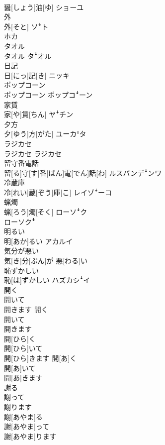 \documentclass[8pt]{extreport}
\begin{document}
\begin{CJK}{UTF8}{min}
\\	醤[しょう]油[ゆ]	ショーユ
\\	外	
\\	外[そと]	ソꜜト 
\\	ホカ
\\	タオル	
\\	タオル	タꜜオル
\\	日記	
\\	日[にっ]記[き]	ニッキ
\\	ポップコーン	
\\	ポップコーン	ポップコꜜーン
\\	家賃	
\\	家[や]賃[ちん]	ヤꜜチン
\\	夕方	
\\	夕[ゆう]方[がた]	ユーカ°タ
\\	ラジカセ	
\\	ラジカセ	ラジカセ
\\	留守番電話	
\\	留[る]守[す]番[ばん]電[でん]話[わ]	ルスバンデꜜンワ
\\	冷蔵庫	
\\	冷[れい]蔵[ぞう]庫[こ]	レイゾꜜーコ
\\	蝋燭	
\\	蝋[ろう]燭[そく]	ローソꜜク 
\\	ローソクꜜ
\\	明るい	
\\	明[あか]るい	アカルイ
\\	気分が悪い	
\\	気[き]分[ぶん]が 悪[わる]い	
\\	恥ずかしい	
\\	恥[は]ずかしい	ハズカシꜜイ
\\	開く 
\\	開いて 
\\	開きます 開く 
\\	開いて 
\\	開きます	
\\	開[ひら]く 
\\	開[ひら]いて 
\\	開[ひら]きます 開[あ]く 
\\	開[あ]いて 
\\	開[あ]きます	
\\	謝る 
\\	謝って 
\\	謝ります	
\\	謝[あやま]る 
\\	謝[あやま]って 
\\	謝[あやま]ります	

\end{CJK}
\end{document}
